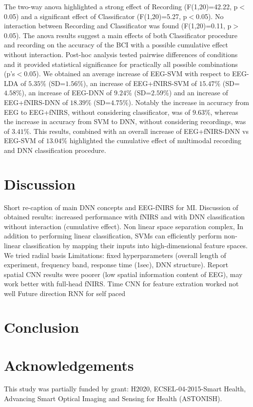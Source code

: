 \documentclass[12pt ]{iopart}
\begin{document}
The two-way anova highlighted a strong effect of Recording (F(1,20)=42.22, p$<$0.05) and a significant effect of Classificator (F(1,20)=5.27, p$<$0.05). No interaction between Recording and Classificator was found (F(1,20)=0.11, p$>$0.05). The anova results suggest a main effects of both Classificator procedure and recording on the accuracy of the BCI with a possible cumulative effect without interaction.
Post-hoc analysis tested pairwise differences  of conditions and it provided statistical significance for practically  all possible combinations (p's$<$0.05).
We obtained an average increase of EEG-SVM with respect to EEG-LDA of $5.35\%$ (SD=$1.56\%$), an increase of EEG+fNIRS-SVM of $15.47\%$ (SD=$4.58\%$), an increase of EEG-DNN of $9.24\%$ (SD=$2.59\%$) and an increase of EEG+fNIRS-DNN of $18.39\%$ (SD=$4.75\%$). Notably the increase in accuracy from EEG to EEG+fNIRS, without considering classificator, was of $9.63\%$, whereas the increase in accuracy from SVM to DNN, without considering recordings, was of  $3.41\%$. This results, combined with an overall increase of EEG+fNIRS-DNN vs EEG-SVM of  $13.04\%$ highlighted the cumulative effect of multimodal recording and DNN classification procedure.

\section{Discussion}
Short re-caption of main DNN concepts and EEG-fNIRS for MI.
Discussion of obtained results:
increased performance with fNIRS and with DNN classification without interaction (cumulative effect).
Non linear space separation complex, 
In addition to performing linear classification, SVMs can efficiently perform  non-linear classification by mapping their inputs into high-dimensional feature spaces.
We tried radial basis
Limitations: fixed hyperparameters
(overall length of experiment, frequency band, response time (1sec), DNN structure). 
Report spatial CNN results were poorer (low spatial information content of EEG), may work better with full-head fNIRS. Time CNN for feature extration worked not well
Future direction RNN for self paced


\section{Conclusion}

\section{Acknowledgements}
This study was partially funded by grant: H2020, ECSEL-04-2015-Smart Health, Advancing Smart Optical Imaging and Sensing for Health (ASTONISH).
 

\newpage
\printbibliography
\cleardoublepage
{}
\end{document}
